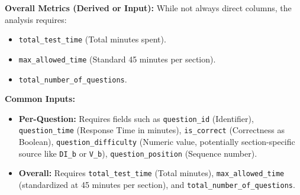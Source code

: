 \documentclass{article}
\begin{document}
\textbf{Overall Metrics (Derived or Input):}
While not always direct columns, the analysis requires:
\begin{itemize}
    \item \texttt{total\_test\_time} (Total minutes spent).
    \item \texttt{max\_allowed\_time} (Standard 45 minutes per section).
    \item \texttt{total\_number\_of\_questions}.
\end{itemize}

\textbf{Common Inputs:}
\begin{itemize}
    \item \textbf{Per-Question:} Requires fields such as \texttt{question\_id} (Identifier), \texttt{question\_time} (Response Time in minutes), \texttt{is\_correct} (Correctness as Boolean), \texttt{question\_difficulty} (Numeric value, potentially section-specific source like \texttt{DI\_b} or \texttt{V\_b}), \texttt{question\_position} (Sequence number).
    \item \textbf{Overall:} Requires \texttt{total\_test\_time} (Total minutes), \texttt{max\_allowed\_time} (standardized at 45 minutes per section), and \texttt{total\_number\_of\_questions}.
\end{itemize}
\end{document}
